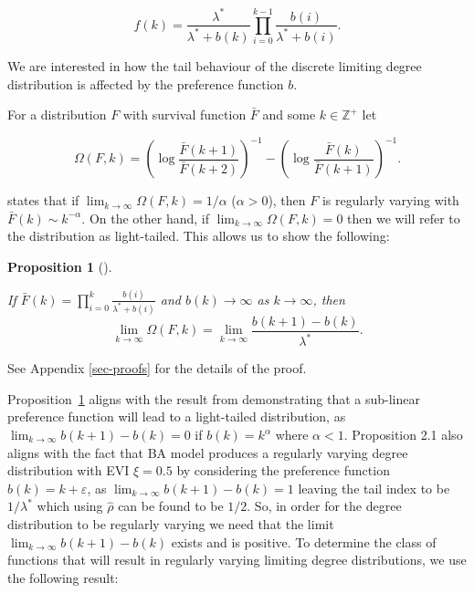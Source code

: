 \documentclass[
  sn-basic,
]{sn-jnl}
\theoremstyle{plain}
\theoremstyle{plain}
\newtheorem{proposition}{Proposition}[section]
\theoremstyle{remark}
\begin{document}
\[
f(k) = \frac{\lambda^*}{\lambda^* + b(k)}\prod_{i=0}^{k-1}\frac{b(i)}{\lambda^*+b(i)}.
\]

We are interested in how the tail behaviour of the discrete limiting
degree distribution is affected by the preference function \(b\).

For a distribution \(F\) with survival function \(\bar F\) and some
\(k\in\mathbb Z^+\) let

\[
\Omega(F,k) = \left(\log\displaystyle\frac{\bar F (k+1)}{\bar F (k+2)}\right)^{-1} - \left(\log\displaystyle\frac{\bar F (k)}{\bar F (k+1)}\right)^{-1}.
\]

\citet{shimura12} states that if
\(\lim_{k\rightarrow\infty} \Omega(F,k) = 1/\alpha\) (\(\alpha>0\)),
then \(F\) is regularly varying with \(\bar F(k) \sim k^{-\alpha}\). On
the other hand, if \(\lim_{k\rightarrow\infty} \Omega(F,k) = 0\) then we
will refer to the distribution as light-tailed. This allows us to show
the following:

\begin{proposition}[]\protect\hypertarget{prp-omega}{}\label{prp-omega}

If \(\bar F(k) = \prod_{i=0}^k\frac{b(i)}{\lambda^* + b(i)}\) and
\(b(k) \rightarrow \infty\) as \(k\rightarrow \infty\), then \[
\lim_{k\rightarrow\infty}\Omega(F,k) = \lim_{k\rightarrow\infty}\frac{b(k+1)-b(k)}{\lambda^*}.
\]

\end{proposition}

See Appendix \ref{sec-proofs} for the details of the proof.

Proposition~\ref{prp-omega} aligns with the result from
\citet{krapivsky01} demonstrating that a sub-linear preference function
will lead to a light-tailed distribution, as
\(\lim_{k\rightarrow\infty} b(k+1)-b(k) = 0\) if \(b(k)=k^\alpha\) where
\(\alpha < 1\). Proposition 2.1 also aligns with the fact that BA model
produces a regularly varying degree distribution with EVI \(\xi=0.5\) by
considering the preference function \(b(k) = k + \varepsilon\), as
\(\lim_{k\rightarrow\infty}b(k+1)-b(k)=1\) leaving the tail index to be
\(1/\lambda^*\) which using \(\hat\rho\) can be found to be \(1/2\). So,
in order for the degree distribution to be regularly varying we need
that the limit \(\lim_{k\rightarrow\infty} b(k+1)-b(k)\) exists and is
positive. To determine the class of functions that will result in
regularly varying limiting degree distributions, we use the following
result:
\end{document}
